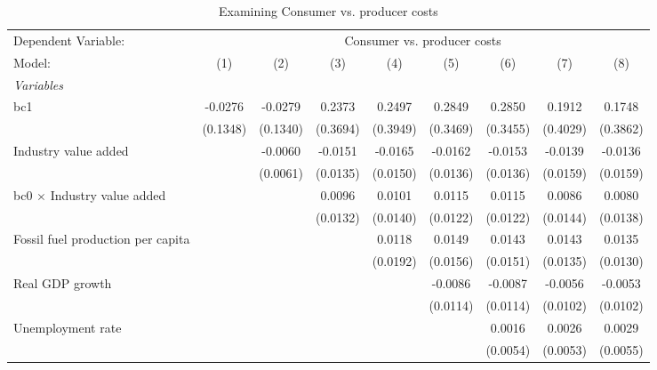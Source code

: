 
\begin{table}[htbp]
   \caption{Examining Consumer vs. producer costs}
   \centering
   \begin{tabular}{lcccccccc}
      \tabularnewline \midrule \midrule
      Dependent Variable: & \multicolumn{8}{c}{Consumer vs. producer costs}\\
      Model:                                  & (1)      & (2)      & (3)      & (4)      & (5)      & (6)      & (7)      & (8)\\  
      \midrule
      \emph{Variables}\\
      bc1                                     & -0.0276  & -0.0279  & 0.2373   & 0.2497   & 0.2849   & 0.2850   & 0.1912   & 0.1748\\   
                                              & (0.1348) & (0.1340) & (0.3694) & (0.3949) & (0.3469) & (0.3455) & (0.4029) & (0.3862)\\   
      Industry value added                    &          & -0.0060  & -0.0151  & -0.0165  & -0.0162  & -0.0153  & -0.0139  & -0.0136\\   
                                              &          & (0.0061) & (0.0135) & (0.0150) & (0.0136) & (0.0136) & (0.0159) & (0.0159)\\   
      bc0 $\times$ Industry value added       &          &          & 0.0096   & 0.0101   & 0.0115   & 0.0115   & 0.0086   & 0.0080\\   
                                              &          &          & (0.0132) & (0.0140) & (0.0122) & (0.0122) & (0.0144) & (0.0138)\\   
      Fossil fuel production per capita       &          &          &          & 0.0118   & 0.0149   & 0.0143   & 0.0143   & 0.0135\\   
                                              &          &          &          & (0.0192) & (0.0156) & (0.0151) & (0.0135) & (0.0130)\\   
      Real GDP growth                         &          &          &          &          & -0.0086  & -0.0087  & -0.0056  & -0.0053\\   
                                              &          &          &          &          & (0.0114) & (0.0114) & (0.0102) & (0.0102)\\   
      Unemployment rate                       &          &          &          &          &          & 0.0016   & 0.0026   & 0.0029\\   
                                              &          &          &          &          &          & (0.0054) & (0.0053) & (0.0055)\\   

\end{tabular}
\end{table}
